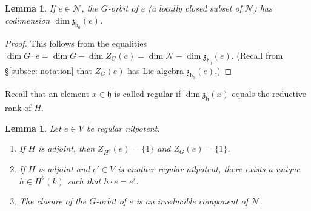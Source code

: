 \documentclass{article} %
\newtheorem{lemma}[proposition]{Lemma}
\numberwithin{equation}{section}
\theoremstyle{definition}
\DeclareMathOperator{\lieh}{\mathfrak{h}}
\newcommand{\frakh}{\mathfrak h}
\newcommand{\frakz}{\mathfrak z}
\begin{document}
\begin{lemma}\label{lemma: codimension nilpotent orbit is centralizer}
If $e\in \mathcal{N}$, the $G$-orbit of $e$ (a locally closed subset of $\mathcal{N}$) has codimension $\dim \mathfrak{z}_{\lieh_0}(e)$. 
\end{lemma}
\begin{proof}
This follows from the equalities $\dim G\cdot e = \dim G  - \dim Z_{G}(e) = \dim \mathcal{N} -\dim \mathfrak{z}_{\lieh_0}(e)$. 
(Recall from \S\ref{subsec: notation} that $Z_G(e)$ has Lie algebra $\frakz_{\lieh_0}(e)$.)
\end{proof}

Recall that an element $x\in \frakh$ is called regular if $\dim \frakz_{\frakh}(x)$ equals the reductive rank of $H$.

\begin{lemma}\label{lemma: regular nilpotent defines top component of N}
Let $e\in V$ be regular nilpotent.
\begin{enumerate}
    \item If $H$ is adjoint, then $Z_{H^{\theta}}(e) = \{1\}$ and $Z_G(e)=\{1\}$.
    \item If $H$ is adjoint and $e'\in V$ is another regular nilpotent, there exists a unique $h\in H^{\theta}(k)$ such that $h\cdot e = e'$.
    \item The closure of the $G$-orbit of $e$ is an irreducible component of $\mathcal{N}$.
\end{enumerate}
\end{lemma}
\end{document}
